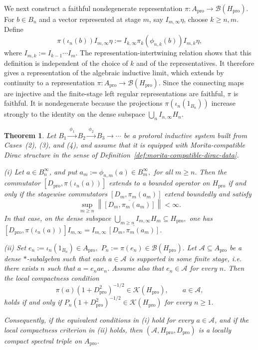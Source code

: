 \documentclass[11pt]{amsart}
\newtheorem{theorem}{Theorem}[section]
\theoremstyle{definition}
\theoremstyle{remark}
\newcommand{\ex}{\mathrm{pro}}
\begin{document}
We next construct a faithful nondegenerate
representation $\pi\colon A_{\ex}\to\mathcal B(H_{\ex}).$ For $b\in B_n$ and a
vector represented at stage $m$, say $I_{m,\infty}\eta$, choose
$k\ge n,m$. Define
\[
\pi(\iota_n(b))I_{m,\infty}\eta:=I_{k,\infty}\pi_k(\phi_{n,k}(b))I_{m,k}\eta,
\]
where $I_{m,k}:=I_{k-1}\cdots I_m$. The representation-intertwining relation
shows that this definition is independent of the choice of \(k\) and of the
representatives. It therefore gives a representation of the algebraic inductive
limit, which extends by continuity to a representation $\pi\colon A_{\ex}\to\mathcal B(H_{\ex}).$
Since the connecting maps are injective and the finite-stage left regular
representations are faithful, $\pi$ is faithful. It is nondegenerate because
the projections $\pi(\iota_n(1_{B_n}))$
increase strongly to the identity on the dense subspace
$\bigcup_n I_{n,\infty}H_n$.

\begin{theorem}
\label{thm:protorus-spectral-general}
Let $B_1\xrightarrow{\ \phi_1\ }B_2\xrightarrow{\ \phi_2\ }B_3\xrightarrow{}\cdots$
be a protoral inductive system built from Cases~\textup{(2)}, \textup{(3)}, and
\textup{(4)}, and assume that it is equipped with Morita-compatible Dirac structure
in the sense of Definition~\ref{def:morita-compatible-dirac-data}. 
\smallskip

\noindent
 
 \emph{(i)}  Let $a\in B_n^\infty$, and put $a_m:=\phi_{n,m}(a)\in B_m^\infty,$ for all $m\ge n.$
Then the commutator $[D_{\ex},\pi(\iota_n(a))]$
extends to a bounded operator on $H_{\ex}$ if and only if the stagewise
commutators $[D_m,\pi_m(a_m)]$
extend boundedly and satisfy
\[
\sup_{m\ge n}
\left\|
\overline{[D_m,\pi_m(a_m)]}
\right\|<\infty.
\]
In that case, on the dense subspace $\bigcup_{m\ge n}I_{m,\infty}H_m\subseteq H_{\ex},$
one has $[D_{\ex},\pi(\iota_n(a))]I_{m,\infty}=I_{m,\infty}\,\overline{[D_m,\pi_m(a_m)]}.$
 
 
 \smallskip

\noindent
 
 \emph{(ii)} Set $e_n:=\iota_n(1_{B_n})\in A_{\ex},$ 
$P_n:=\pi(e_n)\in\mathcal B(H_{\ex}).$ Let $\mathcal A\subseteq A_{\ex}$ be a dense $*$-subalgebra
 such that each $a\in\mathcal A$ is supported in some finite stage, i.e. there exists $n$
such that $a=e_nae_n$. Assume also that $e_n\in\mathcal A$ for every $n$. Then the local
compactness condition
\[
\pi(a)(1+D_{\ex}^2)^{-1/2}\in\mathcal K(H_{\ex}),
\qquad a\in\mathcal A,
\]
holds if and only if $P_n(1+D_{\ex}^2)^{-1/2}\in\mathcal K(H_{\ex})$ for every $n\geq1$.

Consequently, if the equivalent conditions in \textup{(i)} hold for every
$a\in\mathcal A$, and if the local compactness criterion in \textup{(ii)}
holds, then $(\mathcal A,H_{\ex},D_{\ex})$
is a locally compact spectral triple on $A_{\ex}$.

\end{theorem}
\end{document}
